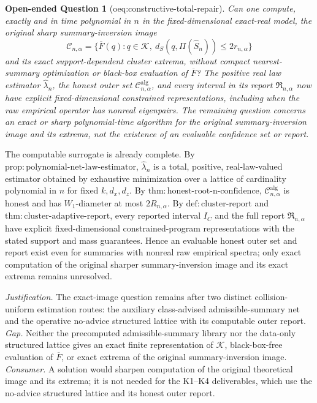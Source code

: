 \documentclass{article}
\newtheorem{openendedquestion}{Open-ended Question}
\begin{document}
\begin{openendedquestion}[oeq:constructive-total-repair]\label{oeq:constructive-total-repair}
Can one compute, exactly and in time polynomial in \(n\) in the fixed-dimensional exact-real model, the original sharp summary-inversion image
\[
\mathcal C_{n,\alpha}
=\{\overline F(q):q\in\mathcal K,\ d_S(q,\Pi(\widehat S_n))\le2r_{n,\alpha}\}
\]
and its exact support-dependent cluster extrema, without compact nearest-summary optimization or black-box evaluation of \(\overline F\)?  The positive real law estimator \(\widehat\lambda_n\), the honest outer set \(\mathcal C^{\mathrm{alg}}_{n,\alpha}\), and every interval in its report \(\mathfrak R_{n,\alpha}\) now have explicit fixed-dimensional constrained representations, including when the raw empirical operator has nonreal eigenpairs.  The remaining question concerns an exact or sharp polynomial-time algorithm for the original summary-inversion image and its extrema, not the existence of an evaluable confidence set or report.
\end{openendedquestion}
The computable surrogate is already complete. By \(\mathrm{prop:polynomial\text{-}net\text{-}law\text{-}estimator}\), \(\widehat\lambda_n\) is a total, positive, real-law-valued estimator obtained by exhaustive minimization over a lattice of cardinality polynomial in \(n\) for fixed \(k,d_x,d_z\). By \(\mathrm{thm:honest\text{-}root\text{-}n\text{-}confidence}\), \(\mathcal C^{\mathrm{alg}}_{n,\alpha}\) is honest and has \(W_1\)-diameter at most \(2R_{n,\alpha}\). By \(\mathrm{def:cluster\text{-}report}\) and \(\mathrm{thm:cluster\text{-}adaptive\text{-}report}\), every reported interval \(I_C\) and the full report \(\mathfrak R_{n,\alpha}\) have explicit fixed-dimensional constrained-program representations with the stated support and mass guarantees. Hence an evaluable honest outer set and report exist even for summaries with nonreal raw empirical spectra; only exact computation of the original sharper summary-inversion image and its exact extrema remains unresolved.
\par\smallskip\noindent \textit{Justification.} The exact-image question remains after two distinct collision-uniform estimation routes: the auxiliary class-advised admissible-summary net and the operative no-advice structured lattice with its computable outer report. \textit{Gap.} Neither the precomputed admissible-summary library nor the data-only structured lattice gives an exact finite representation of \(\mathcal K\), black-box-free evaluation of \(\overline F\), or exact extrema of the original summary-inversion image. \textit{Consumer.} A solution would sharpen computation of the original theoretical image and its extrema; it is not needed for the K1--K4 deliverables, which use the no-advice structured lattice and its honest outer report.
\end{document}
